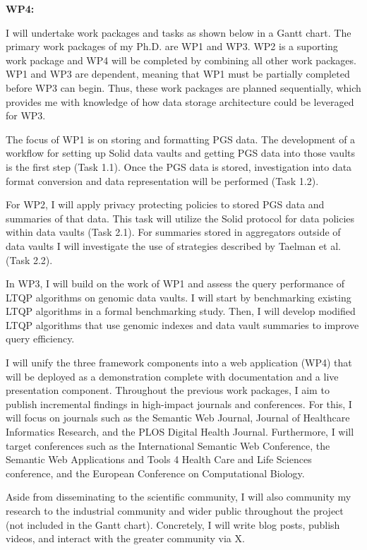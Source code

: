 \documentclass[a4paper,11pt]{article}
\begin{document}
\begin{refsection}
\begin{adjustwidth}{0cm}{0cm}
	\textbf{WP4:      \WPd  {}}
\end{adjustwidth}

\noindent
I will undertake work packages and tasks as shown below in a Gantt chart.
The primary work packages of my Ph.D. are WP1 and WP3.
WP2 is a suporting work package and WP4 will be completed by combining all other work packages.
WP1 and WP3 are dependent, meaning that WP1 must be partially completed before WP3 can begin.
Thus, these work packages are planned sequentially, which provides me with knowledge of how data storage architecture could be leveraged for WP3.

The focus of WP1 is on storing and formatting PGS data.
The development of a workflow for setting up Solid data vaults and getting PGS data into those vaults is the first step (Task 1.1).
Once the PGS data is stored, investigation into data format conversion and data representation will be performed (Task 1.2).

For WP2, I will apply privacy protecting policies to stored PGS data and summaries of that data.
This task will utilize the Solid protocol for data policies within data vaults (Task 2.1).
For summaries stored in aggregators outside of data vaults I will investigate the use of strategies described by Taelman et al. (Task 2.2).

In WP3, I will build on the work of WP1 and assess the query performance of LTQP algorithms on genomic data vaults.
I will start by benchmarking existing LTQP algorithms in a formal benchmarking study.
Then, I will develop modified LTQP algorithms that use genomic indexes and data vault summaries to improve query efficiency.

I will unify the three framework components into a web application (WP4) that will be deployed as a demonstration complete with documentation and a live presentation component. 
Throughout the previous work packages, I aim to publish incremental findings in high-impact journals and conferences.
For this, I will focus on journals such as the Semantic Web Journal, Journal of Healthcare Informatics Research, and the PLOS Digital Health Journal.
Furthermore, I will target conferences such as the International Semantic Web Conference, the Semantic Web Applications and Tools 4 Health Care and Life Sciences conference, and the European Conference on Computational Biology.

Aside from disseminating to the scientific community,
I will also community my research to the industrial community and wider public throughout the project (not included in the Gantt chart).
Concretely, I will write blog posts, publish videos, and interact with the greater community via X.



\end{refsection}
\end{document}
